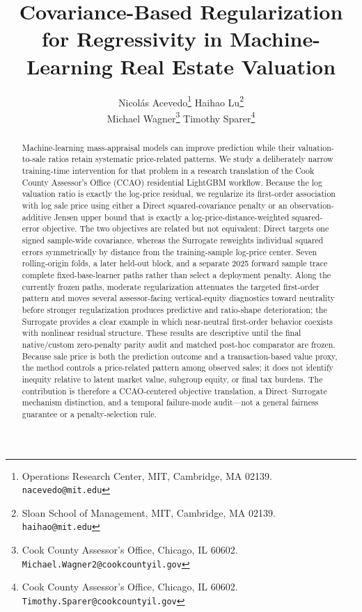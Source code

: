 \documentclass[10pt]{article}
\title{Covariance-Based Regularization for Regressivity in
Machine-Learning Real Estate Valuation}
\author{
Nicol\'as Acevedo\thanks{Operations Research Center, MIT, Cambridge, MA 02139. \texttt{nacevedo@mit.edu}}
\qquad
Haihao Lu\thanks{Sloan School of Management, MIT, Cambridge, MA 02139. \texttt{haihao@mit.edu}}
\\[1ex]
Michael Wagner\thanks{Cook County Assessor's Office, Chicago, IL 60602. \texttt{Michael.Wagner2@cookcountyil.gov}}
\qquad
Timothy Sparer\thanks{Cook County Assessor's Office, Chicago, IL 60602. \texttt{Timothy.Sparer@cookcountyil.gov}}
}
\date{}
\theoremstyle{definition}
\newcommand{\1}{\mathbf{1}}
\begin{document}
\maketitle


\begin{abstract}
Machine-learning mass-appraisal models can improve prediction while their valuation-to-sale ratios retain systematic price-related patterns. We study a deliberately narrow training-time intervention for that problem in a research translation of the Cook County Assessor's Office (CCAO) residential LightGBM workflow. Because the log valuation ratio is exactly the log-price residual, we regularize its first-order association with log sale price using either a Direct squared-covariance penalty or an observation-additive Jensen upper bound that is exactly a log-price-distance-weighted squared-error objective. The two objectives are related but not equivalent: Direct targets one signed sample-wide covariance, whereas the Surrogate reweights individual squared errors symmetrically by distance from the training-sample log-price center. Seven rolling-origin folds, a later held-out block, and a separate 2025 forward sample trace complete fixed-base-learner paths rather than select a deployment penalty. Along the currently frozen paths, moderate regularization attenuates the targeted first-order pattern and moves several assessor-facing vertical-equity diagnostics toward neutrality before stronger regularization produces predictive and ratio-shape deterioration; the Surrogate provides a clear example in which near-neutral first-order behavior coexists with nonlinear residual structure. These results are descriptive until the final native/custom zero-penalty parity audit and matched post-hoc comparator are frozen. Because sale price is both the prediction outcome and a transaction-based value proxy, the method controls a price-related pattern among observed sales; it does not identify inequity relative to latent market value, subgroup equity, or final tax burdens. The contribution is therefore a CCAO-centered objective translation, a Direct--Surrogate mechanism distinction, and a temporal failure-mode audit---not a general fairness guarantee or a penalty-selection rule.
\end{abstract}
\end{document}
